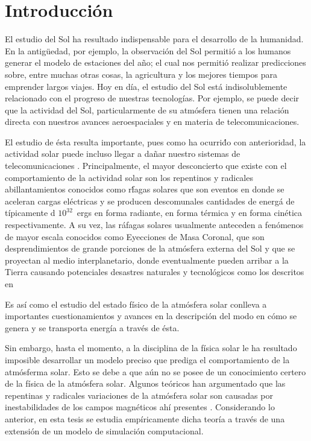 \chapter{Introducci\'on}


El estudio del Sol ha resultado indispensable para el desarrollo de la humanidad. En la antig\"uedad, por ejemplo, la observaci\'on del Sol permiti\'o a los humanos generar el modelo de estaciones del a\~no; el cual nos permiti\'o realizar predicciones sobre, entre muchas otras cosas, la agricultura y los mejores tiempos para emprender largos viajes. Hoy en d\'ia, el estudio del Sol est\'a indisolublemente relacionado con el progreso de nuestras tecnolog\'ias. Por ejemplo, se puede decir que la actividad del Sol, particularmente de su atm\'osfera tienen una relaci\'on directa con nuestros avances aeroespaciales y en materia de telecomunicaciones.

El estudio de \'esta resulta importante, pues como ha ocurri\'do con anterioridad, la actividad solar puede incluso llegar a da\~nar nuestro sistemas de telecomunicaciones \citep{carrington}. Principalmente, el mayor desconcierto que existe con el comportamiento de la actividad solar son los repentinos y radicales abillantamientos conocidos como r\'fagas solares que son eventos en donde se aceleran cargas el\'ectricas y se producen descomunales cantidades de energ\'a de t\'ipicamente d $10^{32}$~ergs en forma radiante, en forma t\'ermica y en forma cin\'etica respectivamente. A su vez, las r\'afagas solares usualmente anteceden a fen\'omenos de mayor escala conocidos como Eyecciones de Masa Coronal, que son desprendimientos de grande porciones de la atm\'osfera externa del Sol y que se proyectan al medio interplanetario, donde eventualmente pueden arribar a la Tierra causando potenciales desastres naturales y tecnol\'ogicos como los descritos en~\citep{carrington}

Es as\'i como el estudio del estado f\'isico de la atm\'osfera solar conlleva a importantes cuestionamientos y avances en la descripci\'on del modo en c\'omo se genera y se transporta energ\'ia a trav\'es de \'esta.

Sin embargo, hasta el momento, a la disciplina de la f\'isica solar le ha resultado imposible desarrollar un modelo preciso que prediga el comportamiento de la atm\'osferma solar. Esto se debe a que a\'un no se posee de un conocimiento certero de la f\'isica de la atm\'osfera solar. Algunos te\'oricos han argumentado que las repentinas y radicales variaciones de la atm\'osfera solar son causadas por inestabilidades de los campos magn\'eticos ah\'i presentes \citep{chromotemp}. Considerando lo anterior, en esta tesis se estudia emp\'iricamente dicha teor\'ia a trav\'es de una extensi\'on de un modelo de simulaci\'on computacional.

